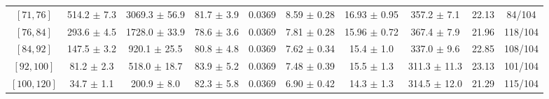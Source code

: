 \begin{tabular}{c||c|c|c|c|c|c|c||c|c}
$[71, 76]$ & 514.2 $\pm$ 7.3 & 3069.3 $\pm$ 56.9 & 81.7 $\pm$ 3.9 & 0.0369 & 8.59 $\pm$ 0.28 & 16.93 $\pm$ 0.95 & 357.2 $\pm$ 7.1 & 22.13 & 84/104\\
$[76, 84]$ & 293.6 $\pm$ 4.5 & 1728.0 $\pm$ 33.9 & 78.6 $\pm$ 3.6 & 0.0369 & 7.81 $\pm$ 0.28 & 15.96 $\pm$ 0.72 & 367.4 $\pm$ 7.9 & 21.96 & 118/104\\
$[84, 92]$ & 147.5 $\pm$ 3.2 & 920.1 $\pm$ 25.5 & 80.8 $\pm$ 4.8 & 0.0369 & 7.62 $\pm$ 0.34 & 15.4 $\pm$ 1.0 & 337.0 $\pm$ 9.6 & 22.85 & 108/104\\
$[92, 100]$ & 81.2 $\pm$ 2.3 & 518.0 $\pm$ 18.7 & 83.9 $\pm$ 5.2 & 0.0369 & 7.48 $\pm$ 0.39 & 15.5 $\pm$ 1.3 & 311.3 $\pm$ 11.3 & 23.13 & 101/104\\
$[100, 120]$ & 34.7 $\pm$ 1.1 & 200.9 $\pm$ 8.0 & 82.3 $\pm$ 5.8 & 0.0369 & 6.90 $\pm$ 0.42 & 14.3 $\pm$ 1.3 & 314.5 $\pm$ 12.0 & 21.29 & 115/104\\
\end{tabular}
